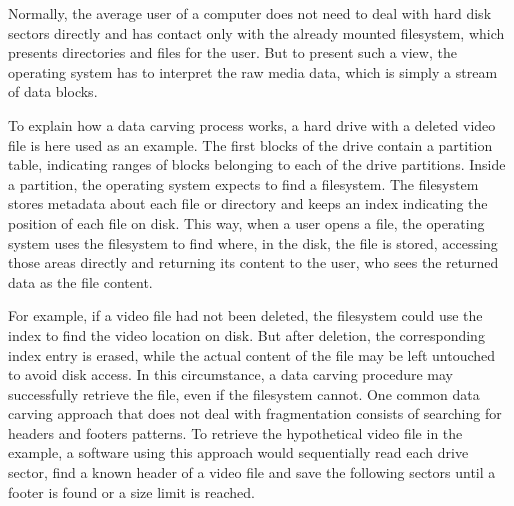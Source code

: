 

Normally, the average user of a computer does not need to deal with hard disk sectors directly and has contact only with the already mounted filesystem, which presents directories and files for the user. But to present such a view, the operating system has to interpret the raw media data, which is simply a stream of data blocks.

To explain how a data carving process works, a hard drive with a deleted video file is here used as an example.
The first blocks of the drive contain a partition table, indicating ranges of blocks belonging to each of the drive partitions. Inside a partition, the operating system expects to find a filesystem. The filesystem stores metadata about each file or directory and keeps an index indicating the position of each file on disk. This way, when a user opens a file, the operating system uses the filesystem to find where, in the disk, the file is stored, accessing those areas directly and returning its content to the user, who sees the returned data as the file content. 
 
For example, if a video file had not been deleted, the filesystem could use the index to find the video location on disk. But after deletion, the corresponding index entry is erased, while the actual content of the file may be left untouched to avoid disk access. In this circumstance, a data carving procedure may successfully retrieve the file, even if the filesystem cannot. One common data carving approach that does not deal with fragmentation consists of searching for headers and footers patterns. To retrieve the hypothetical video file in the example, a software using this approach would sequentially read each drive sector, find a known header of a video file and save the following sectors until a footer is found or a size limit is reached. 
